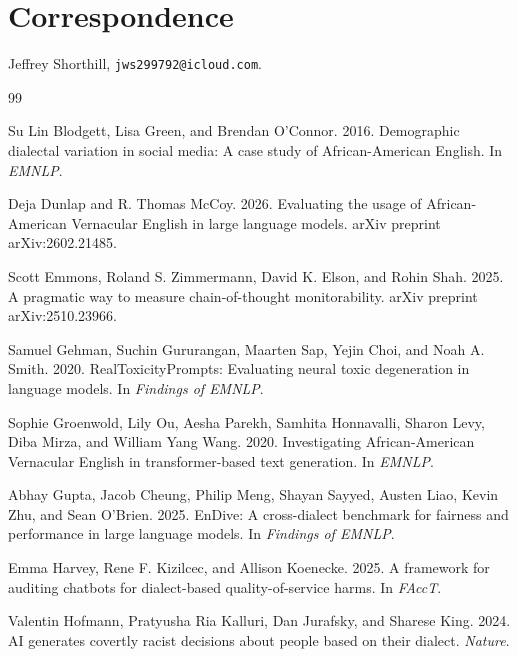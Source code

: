 \documentclass[10pt,a4paper,twocolumn]{article}
\begin{document}
\section*{Correspondence}

Jeffrey Shorthill, \texttt{jws299792@icloud.com}.

\begin{thebibliography}{99}

Su Lin Blodgett, Lisa Green, and Brendan O'Connor. 2016. Demographic dialectal variation in social media: A case study of African-American English. In \emph{EMNLP}.

Deja Dunlap and R. Thomas McCoy. 2026. Evaluating the usage of African-American Vernacular English in large language models. arXiv preprint arXiv:2602.21485.

Scott Emmons, Roland S. Zimmermann, David K. Elson, and Rohin Shah. 2025. A pragmatic way to measure chain-of-thought monitorability. arXiv preprint arXiv:2510.23966.

Samuel Gehman, Suchin Gururangan, Maarten Sap, Yejin Choi, and Noah A. Smith. 2020. RealToxicityPrompts: Evaluating neural toxic degeneration in language models. In \emph{Findings of EMNLP}.

Sophie Groenwold, Lily Ou, Aesha Parekh, Samhita Honnavalli, Sharon Levy, Diba Mirza, and William Yang Wang. 2020. Investigating African-American Vernacular English in transformer-based text generation. In \emph{EMNLP}.

Abhay Gupta, Jacob Cheung, Philip Meng, Shayan Sayyed, Austen Liao, Kevin Zhu, and Sean O'Brien. 2025. EnDive: A cross-dialect benchmark for fairness and performance in large language models. In \emph{Findings of EMNLP}.

Emma Harvey, Rene F. Kizilcec, and Allison Koenecke. 2025. A framework for auditing chatbots for dialect-based quality-of-service harms. In \emph{FAccT}.

Valentin Hofmann, Pratyusha Ria Kalluri, Dan Jurafsky, and Sharese King. 2024. AI generates covertly racist decisions about people based on their dialect. \emph{Nature}.


\end{thebibliography}
\end{document}
